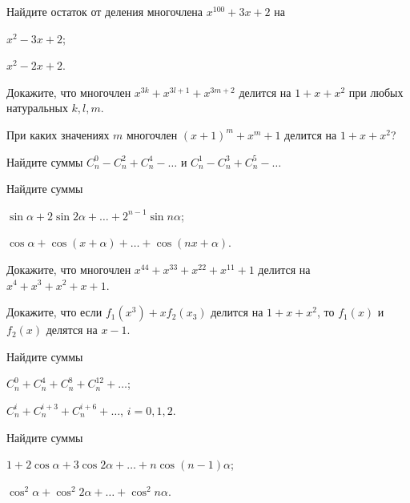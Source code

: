 \documentclass[a4paper, 12pt, num=22]{listok}
\begin{document}
\begin{problem}
	Найдите остаток от деления многочлена $x^{100} + 3x + 2$ на
	\begin{multienum}{2}
		\item $x^2 - 3x + 2$;
		\item $x^2 - 2x + 2$.
	\end{multienum}
\end{problem}
\begin{problem}
	Докажите, что многочлен $x^{3k} + x^{3l+1} + x^{3m+2}$ делится на $1 + x + x^2$ при любых натуральных $k, l, m$.
\end{problem}
\begin{problem}
	При каких значениях $m$ многочлен ${(x + 1)}^m + x^m + 1$ делится на $1 + x + x^2$?
\end{problem}
\begin{problem}
	Найдите суммы $C_n^0 - C_n^2 + C_n^4 - \ldots$ и $C_n^1 - C_n^3 + C_n^5 - \ldots$
\end{problem}
\begin{problem}
	Найдите суммы
	\begin{multienum}{2}
		\item $\sin \alpha + 2 \sin{2\alpha} + \ldots + 2^{n-1} \sin{n\alpha}$;
		\item $\cos \alpha + \cos{(x + \alpha)} + \ldots + \cos{(nx + \alpha)}$.
	\end{multienum}
\end{problem}
\begin{problem}
	Докажите, что многочлен $x^{44} + x^{33} + x^{22} + x^{11} + 1$ делится на $x^4 + x^3 + x^2 + x + 1$.
\end{problem}
\begin{problem}
	Докажите, что если $f_1(x^3) + x f_2(x_3)$ делится на $1 + x + x^2$, то $f_1(x)$ и $f_2(x)$ делятся на $x - 1$.
\end{problem}
\begin{problem}
	Найдите суммы
	\begin{multienum}{2}
		\item $C_n^0 + C_n^4 + C_n^8 + C_n^{12} + \ldots$;
		\item $C_n^i + C_n^{i + 3} + C_n^{i + 6} + \ldots$, $i = 0, 1, 2$.
	\end{multienum}
\end{problem}
\begin{problem}
	Найдите суммы
	\begin{multienum}{2}
		\item $1 + 2 \cos \alpha + 3 \cos{2\alpha} + \ldots + n \cos{(n−1)\alpha}$;
		\item $\cos^2 \alpha + \cos^2 {2\alpha} + \ldots + \cos^2 {n\alpha}$.
	\end{multienum}
\end{problem}
\end{document}
